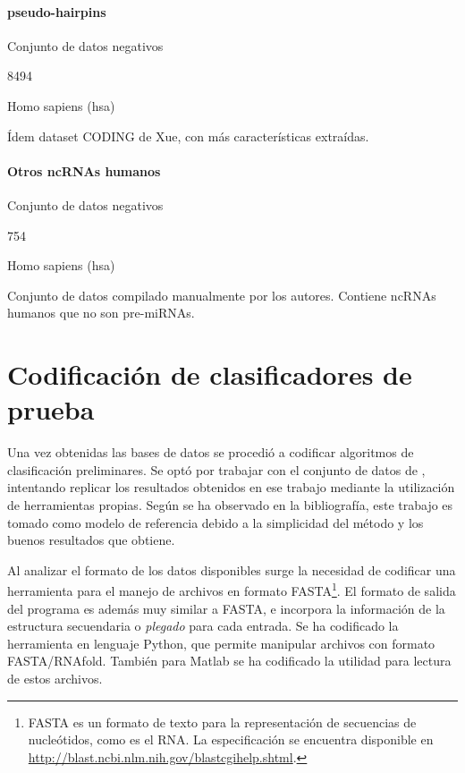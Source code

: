 \documentclass[12pt,bibliography=oldstyle,DIV=12,parskip=half-]{scrreprt}
\begin{document}
\paragraph{pseudo-hairpins}
\begin{description}[style=nextline,leftmargin=5cm,align=right]
\item[Tipo:] Conjunto de datos negativos
\item[Núm. entradas:] 8494
\item[Especies:] Homo sapiens (hsa)
\item[Descripción:] Ídem dataset CODING de Xue, con más
  características extraídas.
\end{description}
%
\paragraph{Otros ncRNAs humanos}
\begin{description}[style=nextline,leftmargin=5cm,align=right]
\item[Tipo:] Conjunto de datos negativos
\item[Núm. entradas:] 754
\item[Especies:] Homo sapiens (hsa)
\item[Descripción:] Conjunto de datos compilado manualmente por los
  autores. Contiene ncRNAs humanos que no son pre-miRNAs.
\end{description}
%
%
%
%
\section{Codificación de clasificadores de prueba}
\label{pruebas}
%
Una vez obtenidas las bases de datos se procedió a codificar
algoritmos de clasificación preliminares.
Se optó por trabajar con el conjunto de datos de \cite{xue},
intentando replicar los resultados obtenidos en ese trabajo mediante
la utilización de herramientas propias. Según se ha observado en la
bibliografía, este trabajo es tomado como modelo de referencia debido a
la simplicidad del método y los buenos resultados que obtiene.

Al analizar el formato de los datos disponibles surge la necesidad
de codificar una herramienta para el manejo de archivos en formato
FASTA\footnote{FASTA es un formato de texto para la representación
  de secuencias de nucleótidos, como es el RNA.
  La especificación se encuentra disponible en
  \url{http://blast.ncbi.nlm.nih.gov/blastcgihelp.shtml}.}.
El formato de salida del programa  es además
muy similar a FASTA, e incorpora la información de la estructura
secuendaria o \emph{plegado} para cada entrada.
%
Se ha codificado la herramienta  en lenguaje Python,
que permite manipular archivos con formato FASTA/RNAfold. También para
Matlab se ha codificado la utilidad  para lectura
de estos archivos.
%
\end{document}
